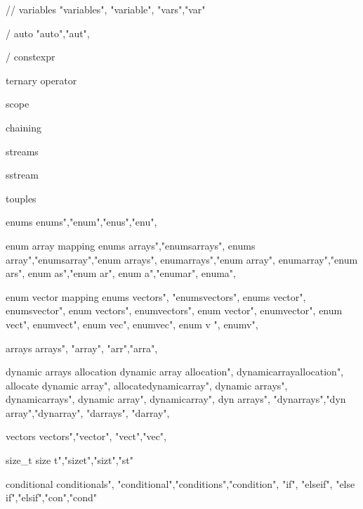         // variables
        "variables", "variable", "vars","var"

        / auto
        "auto","aut",  
        
        / constexpr 
        
         ternary operator
        
         scope
        
         chaining
        
         streams 
        
         sstream 

         touples

         enums
        enums","enum","enus","enu",

         enum array mapping
        enums arrays","enumsarrays",  
        enums array","enumsarray","enum arrays",  
        enumarrays","enum array",  
        enumarray","enum ars",  
        enum as","enum ar",  
        enum a","enumar",  
        enuma",  

         enum vector mapping
        enums vectors",  "enumsvectors",  
        enums vector", 
        enumsvector", 
        enum vectors",
        enumvectors",
        enum vector",  
        enumvector",  
        enum vect",  
        enumvect",  
        enum vec",  
        enumvec",  
        enum v ",  
        enumv",  

         arrays
        arrays", "array", "arr","arra", 

         dynamic arrays allocation
        dynamic array allocation",  
        dynamicarrayallocation",  
        allocate dynamic array",  
        allocatedynamicarray",  
        dynamic arrays",  
        dynamicarrays",  
        dynamic array",  
        dynamicarray",  
        dyn arrays", "dynarrays","dyn array","dynarray", "darrays", "darray",  

         vectors
        vectors","vector", "vect","vec",

         size_t 
        size t","sizet","sizt","st"

         conditional
        conditionals", "conditional","conditions","condition", "if", "elseif", "else if","elsif","con","cond"

